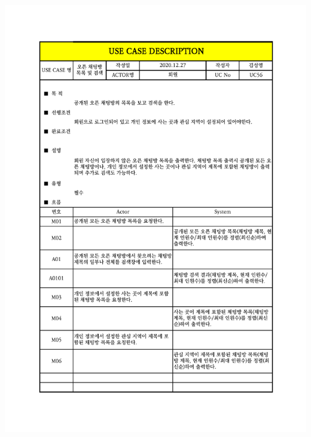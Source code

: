 {{{{{{{{{{{{{{{{{{{{{{{{{{{{{{{{{{{{{{{{{{{{{{{{{{{{{{{{{{{\includegraphics[width=1.1\textwidth]{./Figure/Design/Display/usecase/056.pdf} \\
}}}}}}}}}}}}}}}}}}}}}}}}}}}}}}}}}}}}}}}}}}}}}}}}}}}}}}}}}}}

